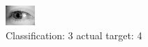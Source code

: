 \begin{figure}[h!]
\begin{center}
\includegraphics[width=0.60\columnwidth]{figures/ID3229_class_3_target_4.png}
\end{center}
\caption{ Classification: 3 actual target: 4}
\label{fig:ID3229_class_3_target_4}
\end{figure}
